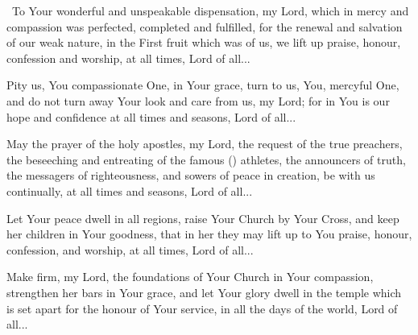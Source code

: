 \documentclass[12pt,twoside,a5paper]{article}
\begin{document}




\cc~To Your wonderful and unspeakable dispensation, my Lord, which in mercy and compassion was perfected, completed and fulfilled, for the renewal and salvation of our weak nature, in the First fruit which was of us, we lift up praise, honour, confession and worship, at all times, Lord of all...


Pity us, You compassionate One, in Your grace, turn to us, You, mercyful One, and do not turn away Your look and care from us, my Lord; for in You is our hope and confidence at all times and seasons, Lord of all...


May the prayer of the holy apostles, my Lord, the request of the true preachers, the beseeching and entreating of the famous () athletes, the announcers of truth, the messagers of righteousness, and sowers of peace in creation, be with us continually, at all times and seasons, Lord of all...


Let Your peace dwell in all regions, raise Your Church by Your Cross, and keep her children in Your goodness, that in her they may lift up to You praise, honour, confession, and worship, at all times, Lord of all...


Make firm, my Lord, the foundations of Your Church in Your compassion, strengthen her bars in Your grace, and let Your glory dwell in the temple which is set apart for the honour of Your service, in all the days of the world, Lord of all...

\end{document}
